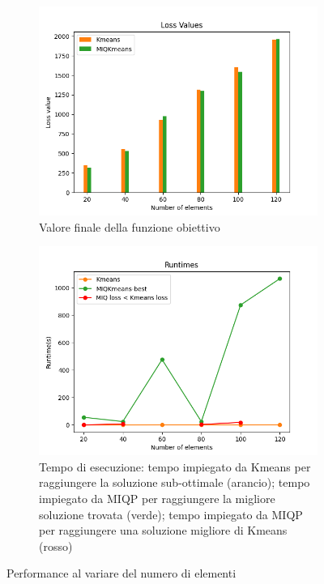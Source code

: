 \documentclass{article}
\begin{document}
    \begin{figure}[H]
     \centering
     \begin{subfigure}[t]{0.49\linewidth}
         \centering
         \includegraphics[width=\linewidth]{../results/plots/loss_size_sint2}
         \caption{Valore finale della funzione obiettivo}
     \end{subfigure}
     \hfill
     \begin{subfigure}[t]{0.49\linewidth}
         \centering
         \includegraphics[width=\linewidth]{../results/plots/runtime_size_sint2}
         \caption{Tempo di esecuzione: tempo impiegato da Kmeans per raggiungere la soluzione sub-ottimale (arancio); tempo impiegato da MIQP per raggiungere la migliore soluzione trovata (verde); tempo impiegato da MIQP per raggiungere una soluzione migliore di Kmeans (rosso)}
     \end{subfigure}
        \label{fig:7}
        \caption{Performance al variare del numero di elementi}
     \end{figure}
\end{document}
